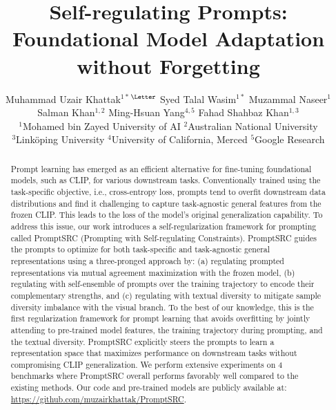 \documentclass[10pt,twocolumn,letterpaper]{article}
\newcommand{\corrAuthor}{$^{\textrm{\Letter}}$}
\begin{document}
\title{Self-regulating Prompts: Foundational Model Adaptation without Forgetting}

\author{Muhammad Uzair Khattak$^{1*}$\corrAuthor \quad 
  Syed Talal Wasim$^{1*}$ \quad 
  Muzammal Naseer$^{1}$ \\ 
  Salman Khan$^{1,2}$ \quad
  Ming-Hsuan Yang$^{4, 5}$ \quad
  Fahad Shahbaz Khan$^{1,3}$
  \vspace{0.5em} \\
  $^{1}$Mohamed bin Zayed University of AI \quad 
  $^{2}$Australian National University \\ 
  $^{3}$Link\"{o}ping University \quad 
  $^{4}$University of California, Merced \quad 
  $^{5}$Google Research
}


\maketitle
\ificcvfinal\thispagestyle{empty}\fi

\begin{abstract}
Prompt learning has emerged as an efficient alternative for fine-tuning foundational models, such as CLIP, for various downstream tasks. Conventionally trained using the task-specific objective, i.e., cross-entropy loss, prompts tend to overfit downstream data distributions and find it challenging to capture task-agnostic general features from the frozen CLIP. This leads to the loss of the model's original generalization capability. To address this issue, our work introduces a self-regularization framework for prompting called PromptSRC (Prompting with Self-regulating Constraints). PromptSRC guides the prompts to optimize for both task-specific and task-agnostic general representations using a three-pronged approach by: (a) regulating {prompted} representations via mutual agreement maximization with the frozen model, (b) regulating with self-ensemble of prompts over the training trajectory to encode their complementary strengths, and (c) regulating with textual diversity to mitigate sample diversity imbalance with the visual branch. To the best of our knowledge, this is the first regularization framework for prompt learning that avoids overfitting by jointly attending to pre-trained model features, the training trajectory during prompting, and the textual diversity. PromptSRC explicitly steers the prompts to learn a representation space that maximizes performance on downstream tasks without compromising CLIP generalization. We perform extensive experiments on 4 benchmarks where PromptSRC  {overall} performs favorably well compared to the existing methods. Our code and pre-trained models are publicly available at: \href{https://github.com/muzairkhattak/PromptSRC}{https://github.com/muzairkhattak/PromptSRC}.
\end{abstract}\vspace{-1em}
\end{document}
